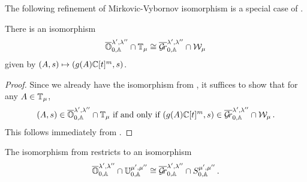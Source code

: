 \documentclass{article} %
\begin{document}
The following refinement of Mirkovic-Vybornov isomorphism is a special case of \cite[Theorem 5.3]{mirkovic2007quiver}.
\begin{theorem} 
\label{th:OGrl}
There is an isomorphism
$$
    \overline{\mathbb O}^{\lambda', \lambda''}_{0,\mathbb A} \cap \mathbb T_\mu \cong \overline{\mathcal{G}\!r}^{\lambda', \lambda''}_{0,\mathbb A} \cap \mathcal W_\mu 
$$
given by $ (A,s) \mapsto (g(A)\mathbb C[t]^m, s)$.
\end{theorem}
\begin{proof}
Since we already have the isomorphism from , it suffices to show that for any $ A \in \mathbb T_\mu$, 
$$ 
    (A,s) \in \overline{\mathbb O}^{\lambda', \lambda''}_{0,\mathbb A} \cap \mathbb T_\mu \text{ if and only if } (g(A)\mathbb C[t]^m, s) \in \overline{\mathcal{G}\!r}^{\lambda', \lambda''}_{0,\mathbb A} \cap \mathcal W_\mu \,. 
$$
This follows immediately from .
\end{proof}
%
% 
% 
\begin{theorem}
\label{th:OTGrW}
The isomorphism from  
restricts to an isomorphism
$$ 
    \overline{\mathbb O}^{\lambda', \lambda''}_{0,\mathbb A} \cap \mathbb U^{\mu', \mu''}_{0,\mathbb A} \cong \overline{\mathcal{G}\!r}^{\lambda', \lambda''}_{0,\mathbb A} \cap S^{\mu', \mu''}_{0,\mathbb A}\,.
$$
\end{theorem}
% 
% 
% 
\end{document}
